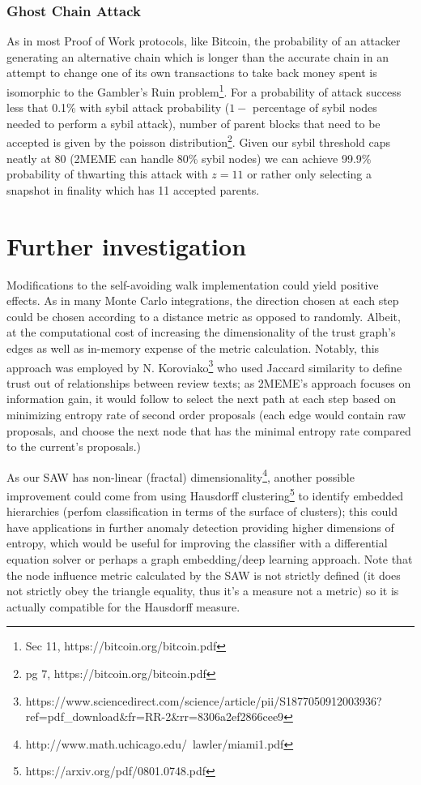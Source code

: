 \documentclass{article}
\theoremstyle{definition}
\theoremstyle{remark}
\theoremstyle{plain}
\begin{document}
\subsubsection{Ghost Chain Attack}
As in most Proof of Work protocols, like Bitcoin, the probability of an attacker generating an alternative chain which is longer than the accurate chain in an attempt to change one of its own transactions to take back money spent is isomorphic to the Gambler's Ruin problem\footnote{Sec 11, https://bitcoin.org/bitcoin.pdf}. For a probability of attack success less that 0.1\% with sybil attack probability ($1-$ percentage of sybil nodes needed to perform a sybil attack), number of parent blocks that need to be accepted is given by the poisson distribution\footnote{pg 7, https://bitcoin.org/bitcoin.pdf}. Given our sybil threshold caps neatly at 80 (2MEME can handle 80\% sybil nodes) we can achieve 99.9\% probability of thwarting this attack with $z=11$ or rather only selecting a snapshot in finality which has 11 accepted parents.

\section{Further investigation}
	Modifications to the self-avoiding walk implementation could yield positive effects. As in many Monte Carlo integrations, the direction chosen at each step could be chosen according to a distance metric as opposed to randomly. Albeit, at the computational cost of increasing the dimensionality of the trust graph’s edges as well as in-memory expense of the metric calculation. Notably, this approach was employed by N. Koroviako\footnote{https://www.sciencedirect.com/science/article/pii/S1877050912003936?ref=pdf\_download\&fr=RR-2\&rr=8306a2ef2866cee9} who used Jaccard similarity to define trust out of relationships between review texts; as 2MEME's approach focuses on information gain, it would follow to select the next path at each step based on minimizing entropy rate of second order proposals (each edge would contain raw proposals, and choose the next node that has the minimal entropy rate compared to the current’s proposals.)
	
	As our SAW has non-linear (fractal) dimensionality\footnote{http://www.math.uchicago.edu/~lawler/miami1.pdf}, another possible improvement could come from using Hausdorff clustering\footnote{https://arxiv.org/pdf/0801.0748.pdf} to identify embedded hierarchies (perfom classification in terms of the surface of clusters); this could have applications in further anomaly detection providing higher dimensions of entropy, which would be useful for improving the classifier with a differential equation solver or perhaps a graph embedding/deep learning approach. Note that the node influence metric calculated by the SAW is not strictly defined (it does not strictly obey the triangle equality, thus it's a measure not a metric) so it is actually compatible for the Hausdorff measure. 
	
\end{document}
